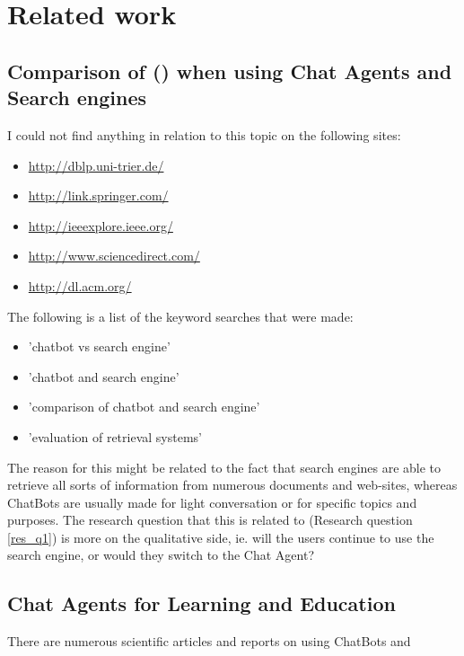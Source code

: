 \chapter{Related work}
\label{chapter3:related_work}


\section{Comparison of  () when using Chat Agents and Search engines}
\label{chapter3:chatbot_vs_search_engine}
I could not find anything in relation to this topic on the following sites:
\begin{itemize}
	\item \url{http://dblp.uni-trier.de/}
	\item \url{http://link.springer.com/}
	\item \url{http://ieeexplore.ieee.org/}
	\item \url{http://www.sciencedirect.com/}
	\item \url{http://dl.acm.org/}
\end{itemize}
The following is a list of the keyword searches that were made:
\begin{itemize}
	\item 'chatbot vs search engine'
	\item 'chatbot and search engine'
	\item 'comparison of chatbot and search engine'
	\item 'evaluation of retrieval systems' 
\end{itemize}
The reason for this might be related to the fact that search engines are able to 
retrieve all sorts of information from numerous documents and web-sites, whereas ChatBots are usually made for light conversation or for specific 
topics and purposes. The research question that this is related to (Research question \ref{res_q1}) is more on the qualitative side, ie. will the 
users continue to use the search engine, or would they switch to the Chat Agent?

\section{Chat Agents for Learning and Education}
\label{chapter3:learning_with_chatbots}
There are numerous scientific articles and reports on using ChatBots and 

